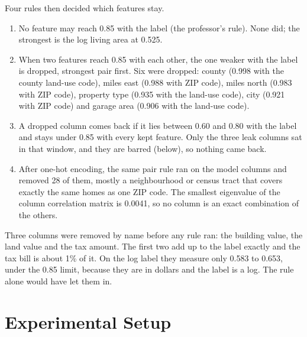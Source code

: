 \documentclass[sigconf,nonacm,10pt]{acmart}
\begin{document}
Four rules then decided which features stay.
\begin{enumerate}
\item No feature may reach 0.85 with the label (the professor's rule). None did; the strongest is the log living area at 0.525.
\item When two features reach 0.85 with each other, the one weaker with the label is dropped, strongest pair first. Six were dropped: county (0.998 with the county land-use code), miles east (0.988 with ZIP code), miles north (0.983 with ZIP code), property type (0.935 with the land-use code), city (0.921 with ZIP code) and garage area (0.906 with the land-use code).
\item A dropped column comes back if it lies between 0.60 and 0.80 with the label and stays under 0.85 with every kept feature. Only the three leak columns sat in that window, and they are barred (below), so nothing came back.
\item After one-hot encoding, the same pair rule ran on the model columns and removed 28 of them, mostly a neighbourhood or census tract that covers exactly the same homes as one ZIP code. The smallest eigenvalue of the column correlation matrix is 0.0041, so no column is an exact combination of the others.
\end{enumerate}

Three columns were removed by name before any rule ran: the building value, the land value and the tax amount. The first two add up to the label exactly and the tax bill is about 1\% of it. On the log label they measure only 0.583 to 0.653, under the 0.85 limit, because they are in dollars and the label is a log. The rule alone would have let them in.

\section{Experimental Setup}
\label{sec:setup}
\end{document}
